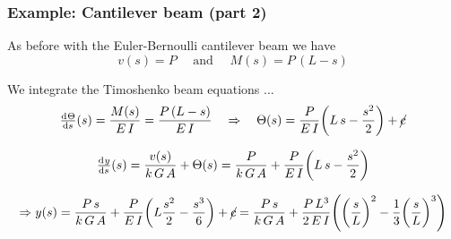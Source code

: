 \begin{frame}
  \frametitle{Example: Cantilever beam (part 2)}
  
  As before with the Euler-Bernoulli cantilever beam we have
  \begin{displaymath}
    v(s) = P \quad \text{ and } \quad M(s) = P \, (L-s)
  \end{displaymath}
  
  \vspace{1em}
  We integrate the Timoshenko beam equations ...
  \vspace{0.3em}
  \begin{displaymath}
    \od{\Theta}{s}(s) = \frac{M(s)}{E \, I} = \frac{P \, (L-s)}{E \, I}
    \quad \Rightarrow \quad
    \Theta(s) = \frac{P}{E \, I} \biggl( L \, s - \frac{s^2}{2} \biggr) + \cancel{c}
  \end{displaymath}
  
  \vspace{1em}
  
  \begin{displaymath}
    \od{y}{s}(s) = \frac{v(s)}{k \, G \, A} + \Theta(s) = \frac{P}{k \, G \, A} + \frac{P}{E \, I} \biggl( L \, s - \frac{s^2}{2} \biggr)
  \end{displaymath}
  
  \begin{displaymath}
    \Rightarrow y(s) = \frac{P \, s}{k \, G \, A} + \frac{P}{E \, I} \biggl( L \frac{s^2}{2} - \frac{s^3}{6} \biggr) + \cancel{c} = \frac{P \, s}{k \, G \, A} + \frac{P \, L^3}{2 \, E \, I} \Biggl( 
      \biggl( \frac{s}{L} \biggr)^2 - \frac{1}{3} \biggl( \frac{s}{L} \biggr)^3 \Biggr)
  \end{displaymath}
\end{frame}



